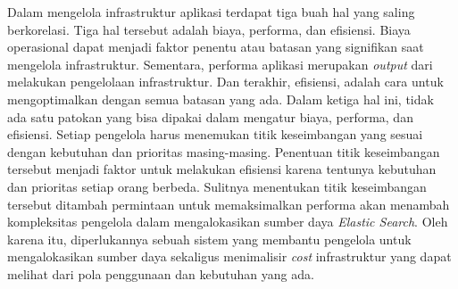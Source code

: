 Dalam mengelola infrastruktur aplikasi terdapat tiga buah hal yang saling berkorelasi. Tiga hal tersebut adalah biaya, performa, dan efisiensi. Biaya operasional dapat menjadi faktor penentu atau batasan yang signifikan saat mengelola infrastruktur. Sementara, performa aplikasi merupakan \textit{output} dari melakukan pengelolaan infrastruktur. Dan terakhir, efisiensi, adalah cara untuk mengoptimalkan dengan semua batasan yang ada. Dalam ketiga hal ini, tidak ada satu patokan yang bisa dipakai dalam mengatur biaya, performa, dan efisiensi. Setiap pengelola harus menemukan titik keseimbangan yang sesuai dengan kebutuhan dan prioritas masing-masing. Penentuan titik keseimbangan tersebut menjadi faktor untuk melakukan efisiensi karena tentunya kebutuhan dan prioritas setiap orang berbeda. Sulitnya menentukan titik keseimbangan tersebut ditambah permintaan untuk memaksimalkan performa akan menambah kompleksitas pengelola dalam mengalokasikan sumber daya \textit{Elastic Search}. Oleh karena itu, diperlukannya sebuah sistem yang membantu pengelola untuk mengalokasikan sumber daya sekaligus menimalisir \textit{cost} infrastruktur yang dapat melihat dari pola penggunaan dan kebutuhan yang ada.